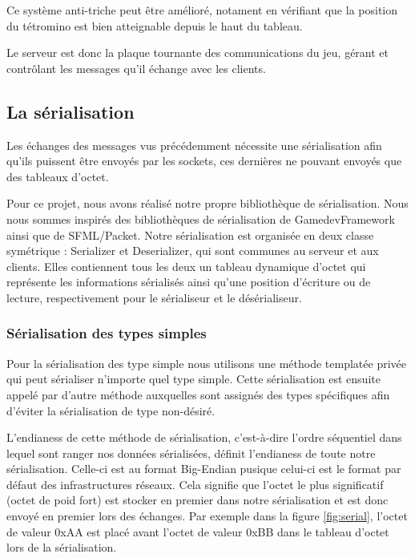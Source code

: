 \documentclass[a4paper, 12pt]{article}
\begin{document}
			Ce système anti-triche peut être amélioré, notament en vérifiant que la position du tétromino est bien atteignable depuis le haut du tableau.

			Le serveur est donc la plaque tournante des communications du jeu, gérant et contrôlant les messages qu'il échange avec les clients. 

	\subsection{La sérialisation}

		Les échanges des messages vus précédemment nécessite une sérialisation afin qu'ils puissent être envoyés par les sockets, ces dernières ne pouvant envoyés que des tableaux d'octet.

		Pour ce projet, nous avons réalisé notre propre bibliothèque de sérialisation. Nous nous sommes inspirés des bibliothèques de sérialisation de GamedevFramework ainsi que de SFML/Packet. 
		Notre sérialisation est organisée en deux classe symétrique : Serializer et Deserializer, qui sont communes au serveur et aux clients. Elles contiennent tous les deux un tableau dynamique d'octet qui représente les informations sérialisés ainsi qu'une position d'écriture ou de lecture, respectivement pour le sérialiseur et le désérialiseur. 
		
		\subsubsection{Sérialisation des types simples}

		Pour la sérialisation des type simple nous utilisons une méthode templatée privée qui peut sérialiser n'importe quel type simple. Cette sérialisation est ensuite appelé par d'autre méthode auxquelles sont assignés des types spécifiques afin d'éviter la sérialisation de type non-désiré.
		
		L'endianess de cette méthode de sérialisation, c'est-à-dire l'ordre séquentiel dans lequel sont ranger nos données sérialisées, définit l'endianess de toute notre sérialisation. Celle-ci est au format Big-Endian pusique celui-ci est le format par défaut des infrastructures réseaux. Cela signifie que l'octet le plus significatif (octet de poid fort) est stocker en premier dans notre sérialisation et est donc envoyé en premier lors des échanges. Par exemple dans la figure \ref{fig:serial}, l'octet de valeur 0xAA est placé avant l'octet de valeur 0xBB dans le tableau d'octet lors de la sérialisation.
\end{document}
